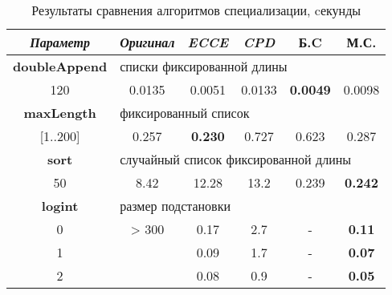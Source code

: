 \begin{table}[h!]
\center
\begin{tabular}{|c|c|c|c|c|c|}
\hline
{\it Параметр} & {\it Оригинал} & {\it ECCE }  & {\it CPD} & {\bf Б.C} & {\bf М.С.} \\ \hline
{\bf doubleAppend} & \multicolumn{5}{|l|}{списки фиксированной длины } \\ \hline
120                & 0.0135 & 0.0051 & 0.0133 & {\bf 0.0049} & 0.0098 \\ \hline


{\bf maxLength} & \multicolumn{5}{|l|}{фиксированный список} \\ \hline

       [1..200] & 0.257 & {\bf 0.230} & 0.727 & 0.623 & 0.287 \\ \hline


{\bf sort} & \multicolumn{5}{|l|}{случайный список фиксированной длины } \\ \hline
50       & 8.42     & 12.28 & 13.2 & 0.239  & {\bf 0.242} \\ \hline


{\bf logint} & \multicolumn{5}{|l|}{размер подстановки} \\ \hline
0 & > 300    & 0.17  & 2.7  & -  &  {\bf 0.11} \\
1 &          & 0.09  & 1.7  & -  &  {\bf 0.07} \\
2 &          & 0.08   & 0.9  & -  & {\bf 0.05} \\
\hline

\end{tabular}
\caption{Результаты сравнения алгоритмов специализации, cекунды}
\label{fig:totalResult}
\end{table}

